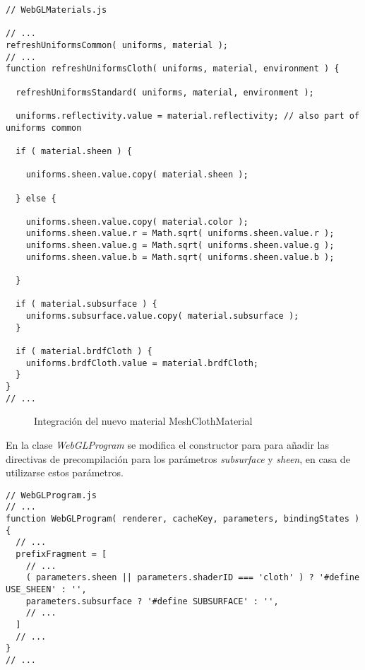 \singlespacing
\begin{lstlisting}[caption=Cambios sobre la clase WebGLMaterials de ThreeJs]
// WebGLMaterials.js

// ...
refreshUniformsCommon( uniforms, material );
// ...
function refreshUniformsCloth( uniforms, material, environment ) {

  refreshUniformsStandard( uniforms, material, environment );

  uniforms.reflectivity.value = material.reflectivity; // also part of uniforms common

  if ( material.sheen ) {

    uniforms.sheen.value.copy( material.sheen );

  } else {

    uniforms.sheen.value.copy( material.color );
    uniforms.sheen.value.r = Math.sqrt( uniforms.sheen.value.r );
    uniforms.sheen.value.g = Math.sqrt( uniforms.sheen.value.g );
    uniforms.sheen.value.b = Math.sqrt( uniforms.sheen.value.b );

  }

  if ( material.subsurface ) {
    uniforms.subsurface.value.copy( material.subsurface );
  }

  if ( material.brdfCloth ) {
    uniforms.brdfCloth.value = material.brdfCloth;
  }
}
// ...
\end{lstlisting}
\singlespacing

\begin{figure}[H]
  \vspace{0.5cm}
  \centering
  \caption{Integraci\'on del nuevo material MeshClothMaterial}
\end{figure}
\singlespacing

En la clase \textit{WebGLProgram} se modifica el constructor para para a\~nadir las directivas de precompilaci\'on
para los par\'ametros \textit{subsurface} y \textit{sheen}, en casa de utilizarse estos par\'ametros.\\

\begin{lstlisting}[caption=Cambios sobre la clase WebGLProgram de ThreeJs]
// WebGLProgram.js
// ...
function WebGLProgram( renderer, cacheKey, parameters, bindingStates ) {
  // ...
  prefixFragment = [
    // ...
    ( parameters.sheen || parameters.shaderID === 'cloth' ) ? '#define USE_SHEEN' : '',
    parameters.subsurface ? '#define SUBSURFACE' : '',
    // ...
  ]
  // ...
}
// ...
\end{lstlisting}
\singlespacing

